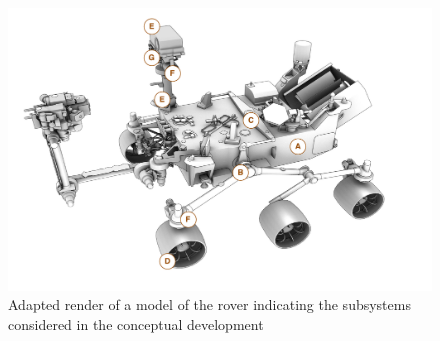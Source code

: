     \begin{figure}[H]
      \centering
      \includegraphics[width=1\linewidth]{figures/concepts-finalConceptRender}
      \caption[Adapted render of a model of the rover indicating the subsystems considered in the conceptual development]{Adapted render of a model of the rover indicating the subsystems considered in the conceptual development \cite{nasa3D}}
      \label{fig:concepts-finalconceptrender}
    \end{figure}
    
